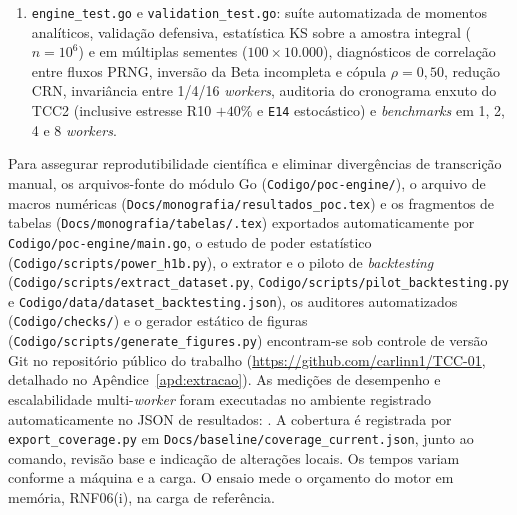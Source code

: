 \documentclass[12pt,openany,oneside,a4paper,english,brazilian,sumario=tradicional]{abntex2}
\begin{document}
\begin{enumerate}
  \item \texttt{engine\_\allowbreak test.go} e \texttt{validation\_\allowbreak test.go}: suíte automatizada de momentos analíticos, validação defensiva, estatística KS sobre a amostra integral ($n=10^6$) e em múltiplas sementes ($100 \times 10.000$), diagnósticos de correlação entre fluxos PRNG, inversão da Beta incompleta e cópula $\rho=0{,}50$, redução CRN, invariância entre 1/4/16 \textit{workers}, auditoria do cronograma enxuto do TCC2 (inclusive estresse R10 $+40\%$ e \texttt{E14} estocástico) e \textit{benchmarks} em 1, 2, 4 e 8 \textit{workers}.
\end{enumerate}

Para assegurar reprodutibilidade científica e eliminar divergências de transcrição manual, os arquivos-fonte do módulo Go (\texttt{Codigo/\allowbreak poc-engine/\allowbreak }), o arquivo de macros numéricas (\texttt{Docs/\allowbreak }\allowbreak\texttt{monografia/\allowbreak }\allowbreak\texttt{resultados\_\allowbreak poc.tex}) e os fragmentos de tabelas (\texttt{Docs/\allowbreak }\allowbreak\texttt{monografia/\allowbreak }\allowbreak\texttt{tabelas/\allowbreak *.tex}) exportados automaticamente por \texttt{Codigo/\allowbreak }\allowbreak\texttt{poc-engine/\allowbreak }\allowbreak\texttt{main.go}, o estudo de poder estatístico (\texttt{Codigo/\allowbreak }\allowbreak\texttt{scripts/\allowbreak }\allowbreak\texttt{power\_\allowbreak h1b.py}), o extrator e o piloto de \textit{backtesting} (\texttt{Codigo/\allowbreak }\allowbreak\texttt{scripts/\allowbreak }\allowbreak\texttt{extract\_\allowbreak dataset.py}, \texttt{Codigo/\allowbreak }\allowbreak\texttt{scripts/\allowbreak }\allowbreak\texttt{pilot\_\allowbreak backtesting.py} e \texttt{Codigo/\allowbreak }\allowbreak\texttt{data/\allowbreak }\allowbreak\texttt{dataset\_\allowbreak backtesting.json}), os auditores automatizados (\texttt{Codigo/\allowbreak checks/\allowbreak }) e o gerador estático de figuras (\texttt{Codigo/\allowbreak }\allowbreak\texttt{scripts/\allowbreak }\allowbreak\texttt{generate\_\allowbreak figures.py}) encontram-se sob controle de versão Git no repositório público do trabalho (\url{https://github.com/carlinn1/TCC-01}, detalhado no Apêndice~\ref{apd:extracao}). As medições de desempenho e escalabilidade multi-\textit{worker} foram executadas no ambiente registrado automaticamente no JSON de resultados: \benchEnvironment{}. A cobertura é registrada por \texttt{export\_\allowbreak coverage.py} em \texttt{Docs/\allowbreak baseline/\allowbreak coverage\_\allowbreak current.json}, junto ao comando, revisão base e indicação de alterações locais. Os tempos variam conforme a máquina e a carga. O ensaio mede o orçamento do motor em memória, RNF06(i), na carga de referência.
\end{document}
